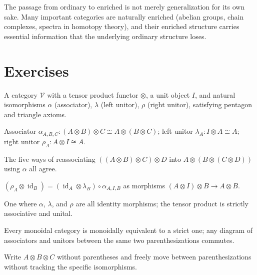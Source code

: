 The passage from ordinary to enriched is not merely generalization for its own
sake. Many important categories are naturally enriched (abelian groups,
chain complexes, spectra in homotopy theory), and their enriched structure
carries essential information that the underlying ordinary structure loses.

\section{Exercises}

\begin{exercisesbox}
\begin{qa}
       {A category $\mathcal{V}$ with a tensor product functor $\otimes$, a unit
        object $I$, and natural isomorphisms $\alpha$ (associator), $\lambda$
        (left unitor), $\rho$ (right unitor), satisfying pentagon and triangle axioms.}

       {Associator $\alpha_{A,B,C} : (A\otimes B)\otimes C \cong A\otimes(B\otimes C)$;
        left unitor $\lambda_A : I\otimes A \cong A$; right unitor $\rho_A : A\otimes I \cong A$.}

       {The five ways of reassociating $((A\otimes B)\otimes C)\otimes D$ into
        $A\otimes(B\otimes(C\otimes D))$ using $\alpha$ all agree.}

       {$(\rho_A \otimes \operatorname{id}_B) = (\operatorname{id}_A \otimes \lambda_B) \circ
        \alpha_{A,I,B}$ as morphisms $(A\otimes I)\otimes B \to A\otimes B$.}

       {One where $\alpha$, $\lambda$, and $\rho$ are all identity morphisms;
        the tensor product is strictly associative and unital.}

       {Every monoidal category is monoidally equivalent to a strict one;
        any diagram of associators and unitors between the same two
        parenthesizations commutes.}

       {Write $A \otimes B \otimes C$ without parentheses and freely move between
        parenthesizations without tracking the specific isomorphisms.}


\end{qa}
\end{exercisesbox}
